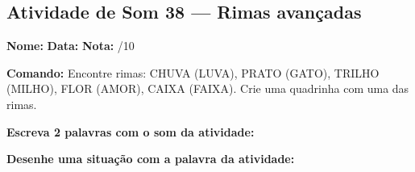 \subsection{Atividade de Som 38 --- Rimas avançadas}
\begin{exercicio}



\noindent\textbf{Nome:} \underline{\hspace{3.2cm}} \quad \textbf{Data:} \underline{\hspace{1.6cm}} \quad \textbf{Nota:} \underline{\hspace{0.9cm}}/10


\noindent\textbf{Comando:} Encontre rimas: CHUVA (LUVA), PRATO (GATO), TRILHO (MILHO), FLOR (AMOR), CAIXA (FAIXA). Crie uma quadrinha com uma das rimas.


\begin{center}
\end{center}

\noindent\textbf{Escreva 2 palavras com o som da atividade:}

\begin{center}
  \underline{\hspace{3cm}} \quad \underline{\hspace{3cm}}
\end{center}

\noindent\textbf{Desenhe uma situação com a palavra da atividade:}

\begin{center}
\end{center}

\end{exercicio}



